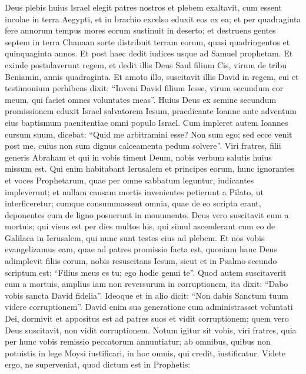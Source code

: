 \begin{biblechapter}
\begin{biblechapter}
\begin{biblechapter}
\begin{biblechapter}
\begin{biblechapter}
\begin{biblechapter}
\begin{biblechapter}
\begin{biblechapter}
\begin{biblechapter}
\begin{biblechapter}
\begin{biblechapter}
\begin{biblechapter}
\begin{biblechapter}
\verse Deus plebis huius Israel elegit patres nostros et plebem exaltavit, cum essent incolae in terra Aegypti, et in brachio excelso eduxit eos ex ea; 
\verse et per quadraginta fere annorum tempus mores eorum sustinuit in deserto; 
\verse et destruens gentes septem in terra Chanaan sorte distribuit terram eorum, 
\verse quasi quadringentos et quinquaginta annos. Et post haec dedit iudices usque ad Samuel prophetam. 
\verse Et exinde postulaverunt regem, et dedit illis Deus Saul filium Cis, virum de tribu Beniamin, annis quadraginta. 
\verse Et amoto illo, suscitavit illis David in regem, cui et testimonium perhibens dixit: “Inveni David filium Iesse, virum secundum cor meum, qui faciet omnes voluntates meas”.
 \verse Huius Deus ex semine secundum promissionem eduxit Israel salvatorem Iesum, 
 \verse praedicante Ioanne ante adventum eius baptismum paenitentiae omni populo Israel. 
\verse Cum impleret autem Ioannes cursum suum, dicebat: “Quid me arbitramini esse? Non sum ego; sed ecce venit post me, cuius non sum dignus calceamenta pedum solvere”.
 \verse Viri fratres, filii generis Abraham et qui in vobis timent Deum, nobis verbum salutis huius missum est. 
\verse Qui enim habitabant Ierusalem et principes eorum, hunc ignorantes et voces Prophetarum, quae per omne sabbatum leguntur, iudicantes impleverunt; 
\verse et nullam causam mortis invenientes petierunt a Pilato, ut interficeretur; 
\verse cumque consummassent omnia, quae de eo scripta erant, deponentes eum de ligno posuerunt in monumento. 
\verse Deus vero suscitavit eum a mortuis; 
\verse qui visus est per dies multos his, qui simul ascenderant cum eo de Galilaea in Ierusalem, qui nunc sunt testes eius ad plebem.
 \verse Et nos vobis evangelizamus eam, quae ad patres promissio facta est, 
\verse quoniam hanc Deus adimplevit filiis eorum, nobis resuscitans Iesum, sicut et in Psalmo secundo scriptum est:
 “Filius meus es tu; ego hodie genui te”.
 \verse Quod autem suscitaverit eum a mortuis, amplius iam non reversurum in corruptionem, ita dixit: “Dabo vobis sancta David fidelia”.
 \verse Ideoque et in alio dicit:
 “Non dabis Sanctum tuum videre corruptionem”.
 \verse David enim sua generatione cum administrasset voluntati Dei, dormivit et appositus est ad patres suos et vidit corruptionem; 
\verse quem vero Deus suscitavit, non vidit corruptionem. 
\verse Notum igitur sit vobis, viri fratres, quia per hunc vobis remissio peccatorum annuntiatur; ab omnibus, quibus non potuistis in lege Moysi iustificari, 
\verse in hoc omnis, qui credit, iustificatur. 
\verse Videte ergo, ne superveniat, quod dictum est in Prophetis:

\end{biblechapter}
\end{biblechapter}
\end{biblechapter}
\end{biblechapter}
\end{biblechapter}
\end{biblechapter}
\end{biblechapter}
\end{biblechapter}
\end{biblechapter}
\end{biblechapter}
\end{biblechapter}
\end{biblechapter}
\end{biblechapter}
